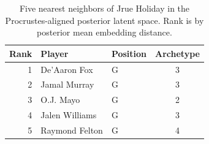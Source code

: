 \begin{table}[htbp]
  \centering\small
  \begin{tabular}{rllc}
    \toprule
    Rank & Player & Position & Archetype \\
    \midrule
    1 & De'Aaron Fox & G & 3 \\
    2 & Jamal Murray & G & 3 \\
    3 & O.J. Mayo & G & 2 \\
    4 & Jalen Williams & G & 3 \\
    5 & Raymond Felton & G & 4 \\
    \bottomrule
  \end{tabular}
  \caption{Five nearest neighbors of Jrue Holiday in the Procrustes-aligned posterior latent space. Rank is by posterior mean embedding distance.}
  \label{tab:Jrue_Holiday_neighbors}
\end{table}

